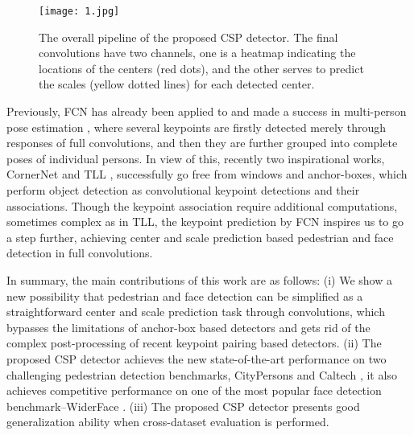 \documentclass[review]{elsarticle}
\begin{document}
\begin{figure}[t]
\begin{center}
\texttt{[image: 1.jpg]}
\end{center}
   \caption{The overall pipeline of the proposed CSP detector. The final convolutions have two channels, one is a heatmap indicating the locations of the centers (red dots), and the other serves to predict the scales (yellow dotted lines) for each detected center.}
\label{fig:pipeline}
\end{figure}

Previously, FCN has already been applied to and made a success in multi-person pose estimation \cite{cao2016realtime,newell2017associative}, where several keypoints are firstly detected merely through responses of full convolutions, and then they are further grouped into complete poses of individual persons. In view of this, recently two inspirational works, CornerNet \cite{Law_2018_ECCV} and TLL \cite{Song_2018_ECCV}, successfully go free from windows and anchor-boxes, which perform object detection as convolutional keypoint detections and their associations. Though the keypoint association require additional computations, sometimes complex as in TLL, the keypoint prediction by FCN inspires us to go a step further, achieving center and scale prediction based pedestrian and face detection in full convolutions.

In summary, the main contributions of this work are as follows: (i) We show a new possibility that pedestrian and face detection can be simplified as a straightforward center and scale prediction task through convolutions, which bypasses the limitations of anchor-box based detectors and gets rid of the complex post-processing of recent keypoint pairing based detectors. (ii) The proposed CSP \cite{liu2019high} detector achieves the new state-of-the-art performance on two challenging pedestrian detection benchmarks, CityPersons \cite{zhang2017citypersons} and Caltech \cite{dollar2012pedestrian}, it also achieves competitive performance on one of the most popular face detection benchmark--WiderFace \cite{yang2016wider}.
(iii) The proposed CSP detector presents good generalization ability when cross-dataset evaluation is performed.
\end{document}
